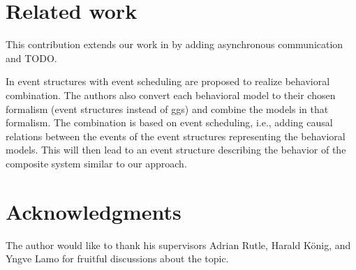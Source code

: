 \documentclass[a4paper]{easychair}
\begin{document}
\section{Related work}
This contribution extends our work in \cite{krauterBehavioralConsistencyHeterogeneous2021} by adding asynchronous communication and TODO.

In \cite{kienzleUnifyingFrameworkHomogeneous2019} event structures with event scheduling are proposed to realize behavioral combination.
The authors also convert each behavioral model to their chosen formalism (event structures instead of \glspl{gg}) and combine the models in that formalism.
The combination is based on event scheduling, i.e., adding causal relations between the events of the event structures representing the behavioral models.
This will then lead to an event structure describing the behavior of the composite system similar to our approach.



\section{Acknowledgments} \label{sect:acks}
The author would like to thank his supervisors Adrian Rutle, Harald König, and Yngve Lamo for fruitful discussions about the topic.
\label{sect:bib}

%
%
%



\end{document}
